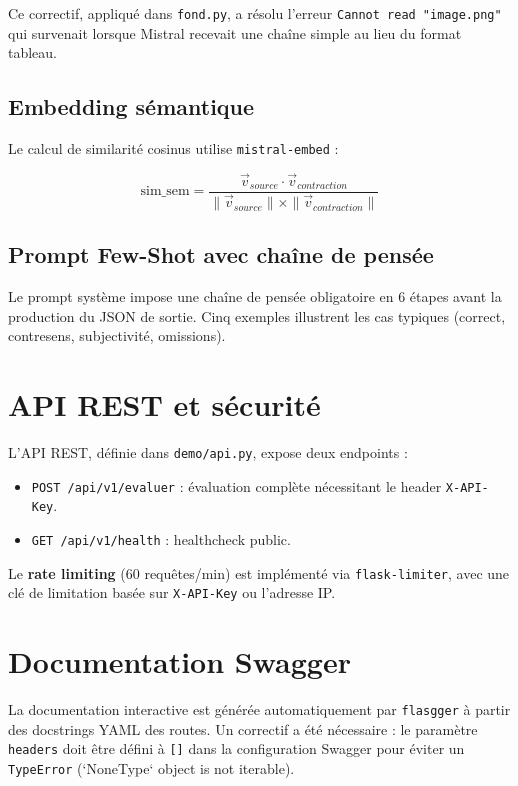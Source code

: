 Ce correctif, appliqué dans \texttt{fond.py}, a résolu l'erreur \texttt{Cannot read "image.png"} qui survenait lorsque Mistral recevait une chaîne simple au lieu du format tableau.

\subsection{Embedding sémantique}

Le calcul de similarité cosinus utilise \texttt{mistral-embed} :

\begin{equation}
\text{sim\_sem} = \frac{\vec{v}_{source} \cdot \vec{v}_{contraction}}{\|\vec{v}_{source}\| \times \|\vec{v}_{contraction}\|}
\end{equation}

\subsection{Prompt Few-Shot avec chaîne de pensée}

Le prompt système impose une chaîne de pensée obligatoire en 6 étapes avant la production du JSON de sortie. Cinq exemples illustrent les cas typiques (correct, contresens, subjectivité, omissions).

\section{API REST et sécurité}

L'API REST, définie dans \texttt{demo/api.py}, expose deux endpoints :

\begin{itemize}
    \item \texttt{POST /api/v1/evaluer} : évaluation complète nécessitant le header \texttt{X-API-Key}.
    \item \texttt{GET /api/v1/health} : healthcheck public.
\end{itemize}

Le \textbf{rate limiting} (60 requêtes/min) est implémenté via \texttt{flask-limiter}, avec une clé de limitation basée sur \texttt{X-API-Key} ou l'adresse IP.

\section{Documentation Swagger}

La documentation interactive est générée automatiquement par \texttt{flasgger} à partir des docstrings YAML des routes. Un correctif a été nécessaire : le paramètre \texttt{headers} doit être défini à \texttt{[]} dans la configuration Swagger pour éviter un \texttt{TypeError} (`NoneType` object is not iterable).

